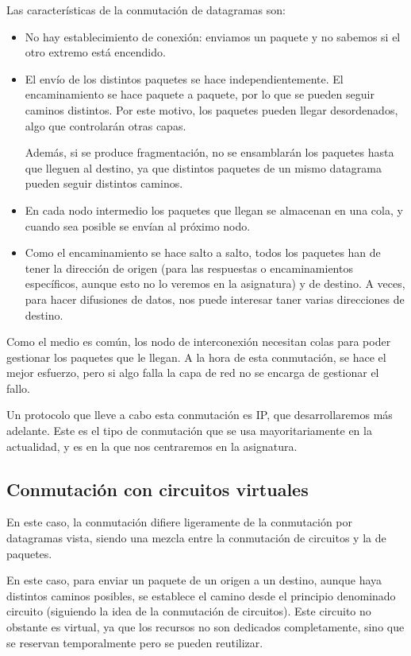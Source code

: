 Las características de la conmutación de datagramas son:
\begin{itemize}
    \item No hay establecimiento de conexión: enviamos un paquete y no sabemos si el otro extremo está encendido.
    \item El envío de los distintos paquetes se hace independientemente. El encaminamiento se hace paquete a paquete, por lo que se pueden seguir caminos distintos. Por este motivo, los paquetes pueden llegar desordenados, algo que controlarán otras capas.
    
    Además, si se produce fragmentación, no se ensamblarán los paquetes hasta que lleguen al destino, ya que distintos paquetes de un mismo datagrama pueden seguir distintos caminos. 
    \item En cada nodo intermedio los paquetes que llegan se almacenan en una cola, y cuando sea posible se envían al próximo nodo. 
    \item Como el encaminamiento se hace salto a salto, todos los paquetes han de tener la dirección de origen (para las respuestas o encaminamientos específicos, aunque esto no lo veremos en la asignatura) y de destino. A veces, para hacer difusiones de datos, nos puede interesar taner varias direcciones de destino.
\end{itemize}

Como el medio es común, los nodo de interconexión necesitan colas para poder gestionar los paquetes que le llegan.
A la hora de esta conmutación, se hace el mejor esfuerzo, pero si algo falla la capa de red no se encarga de gestionar el fallo.

Un protocolo que lleve a cabo esta conmutación es \acrshort{IP}, que desarrollaremos más adelante.
Este es el tipo de conmutación que se usa mayoritariamente en la actualidad, y es en la que nos centraremos en la asignatura.

\subsection{Conmutación con circuitos virtuales}

En este caso, la conmutación difiere ligeramente de la conmutación por datagramas vista, siendo una mezcla entre la conmutación de circuitos y la de paquetes.

En este caso, para enviar un paquete de un origen a un destino, aunque haya distintos caminos posibles, se establece el camino desde el principio denominado circuito (siguiendo la idea de la conmutación de circuitos). Este circuito no obstante es virtual, ya que los recursos no son dedicados completamente, sino que se reservan temporalmente pero se pueden reutilizar.

